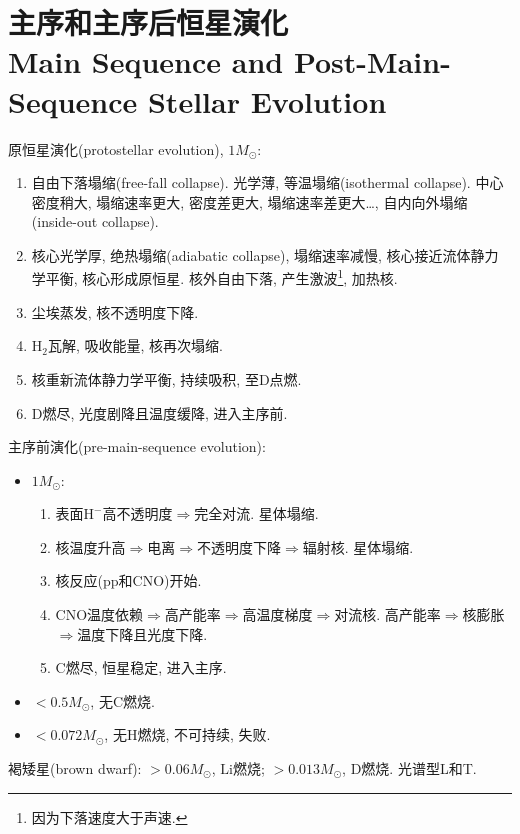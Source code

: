 \chapter{主序和主序后恒星演化\\Main Sequence and Post-Main-Sequence Stellar Evolution}

原恒星演化(protostellar evolution), $1M_\odot$:
\begin{enumerate}
    \item 自由下落塌缩(free-fall collapse). 光学薄, 等温塌缩(isothermal collapse). 中心密度稍大, 塌缩速率更大, 密度差更大, 塌缩速率差更大\dots, 自内向外塌缩(inside-out collapse).
    \item 核心光学厚, 绝热塌缩(adiabatic collapse), 塌缩速率减慢, 核心接近流体静力学平衡, 核心形成原恒星. 核外自由下落, 产生激波\footnote{因为下落速度大于声速.}, 加热核.
    \item 尘埃蒸发, 核不透明度下降.
    \item $\text{H}_2$瓦解, 吸收能量, 核再次塌缩.
    \item 核重新流体静力学平衡, 持续吸积, 至$\text{D}$点燃.
    \item $\text{D}$燃尽, 光度剧降且温度缓降, 进入主序前.
\end{enumerate}

主序前演化(pre-main-sequence evolution):
\begin{itemize}
    \item $1M_\odot$:
    \begin{enumerate}
        \item 表面$\text{H}^-$高不透明度$\Longrightarrow$完全对流. 星体塌缩.
        \item 核温度升高$\Longrightarrow$电离$\Longrightarrow$不透明度下降$\Longrightarrow$辐射核. 星体塌缩.
        \item 核反应(pp和CNO)开始.
        \item CNO温度依赖$\Longrightarrow$高产能率$\Longrightarrow$高温度梯度$\Longrightarrow$对流核.  高产能率$\Longrightarrow$核膨胀$\Longrightarrow$温度下降且光度下降.
        \item $\text{C}$燃尽, 恒星稳定, 进入主序.
    \end{enumerate}
    \item $<0.5M_\odot$, 无$\text{C}$燃烧.
    \item $<0.072M_\odot$, 无$\text{H}$燃烧, 不可持续, 失败.
\end{itemize}

褐矮星(brown dwarf): $>0.06M_\odot$, $\text{Li}$燃烧; $>0.013M_\odot$, $\text{D}$燃烧. 光谱型L和T.

